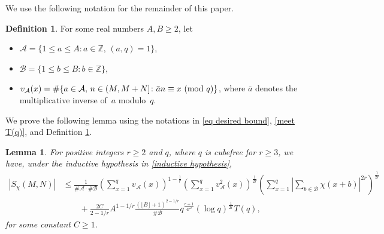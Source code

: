 \documentclass[12pt]{amsart}
\theoremstyle{plain}
\newtheorem{lemma}[theorem]{Lemma}
\theoremstyle{definition}
\newtheorem{definition}[theorem]{Definition}
\newcommand{\cA}{{\mathcal{A}}}
\newcommand{\cB}{{\mathcal{B}}}
\renewcommand{\pmod}[1]{{\ifmmode\text{\rm\ (mod~$#1$)}\else\discretionary{}{}{\hbox{ }}\rm(mod~$#1$)\fi}}
\begin{document}
We use the following notation for the remainder of this paper.
\begin{definition} \label{def A B v}
For some real numbers $A,B\ge2$, let
\begin{itemize}
\item $\cA=\{1\le a \le A\colon a\in\mathbb{Z},\, (a, q)=1\}$,
\item $\cB=\{1\le b\le B\colon b\in\mathbb{Z}\}$,
\item $v_\cA(x)=\#\{a\in\cA,\, n\in(M,M+N] \colon \bar{a}n\equiv x \pmod{q}\}$, where $\bar{a}$ denotes the multiplicative inverse of~$a$ modulo~$q$.
\end{itemize}
\end{definition}

We prove the following lemma using the notations in \eqref{eq desired bound}, \eqref{meet T(q)}, and Definition \ref{def A B v}.
\begin{lemma}\label{eq after Holder}
For positive integers $r\ge 2$ and $q$, where $q$ is cubefree for $r\ge 3$, we have, under the inductive hypothesis in \eqref{inductive hypothesis}, 
    \begin{align*}
    \left|  S_\chi\left(M, N\right)\right|
    &\le
    \frac{1}{\#\cA\cdot \#\cB}\left(\sum_{x=1}^q v_\cA(x)\right)^{1-\frac{1}{r}}
    \left(\sum_{x=1}^q v^2_{\cA}(x)\right)^{\frac{1}{2r}}\left(\sum_{x=1}^q\left|\sum_{b \in \cB}\chi\left(x+b\right)\right|^{2r}\right)^\frac{1}{2r}
    \\
    &\qquad{}+
\frac{2C}{2-1/r} A^{1-1/r} \frac{(\lfloor B\rfloor+1)^{2-1/r}}{\#\cB} q^{\frac{r+1}{4r^2}} (\log q)^{\frac{1}{2r}} T(q),   
\end{align*}
for some constant $C\ge 1$.
\end{lemma}
\end{document}
